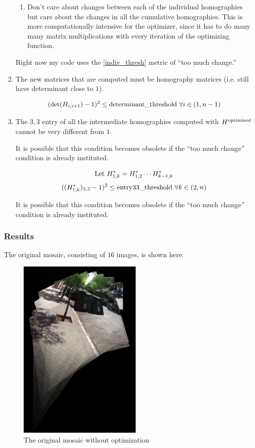 \documentclass{article}
\begin{document}
\begin{enumerate}
\begin{enumerate}
\item Don't care about changes between each of the individual homographies but
care about the changes in all the cumulative homographies. This is more
computationally intensive for the optimizer, since it has to do many many
matrix multiplications with every iteration of the optimizing function.  

\end{enumerate} 

Right now my code uses the \ref{indiv_thresh} metric of ``too much change.''

\item The new matrices that are computed must be homography matrices (i.e.
still have determinant close to $1$).

\[(\det(H_{i, i+1}) - 1)^2 \leq \textnormal{determinant\_threshold } \forall i \in (1, n-1)\] 

\item The $3, 3$ entry of all the intermediate homographies computed with
$H^{\textnormal{optimized}}$ cannot be very different from $1$.

It is possible that this condition becomes obsolete if the ``too much
change'' condition is already instituted. 

\[\textnormal{Let } H_{1, k}^{*} = H_{1, 2}^{*} \cdots H_{k - 1, k}^{*}\]
\[((H_{1, k}^{*})_{3, 3} - 1)^2 \leq \textnormal{entry33\_threshold } \forall k \in (2, n)\]

It is possible that this condition becomes obsolete if the ``too much
change'' condition is already instituted. 

\end{enumerate}

\subsubsection{Results}

The original mosaic, consisting of $16$ images, is shown here: 

\begin{figure}[h!]
\centering
\includegraphics[width=6cm]{test_set_16/regmos0016_edit.jpg}
\caption{The original mosaic without optimization}
\end{figure}
\end{document}
